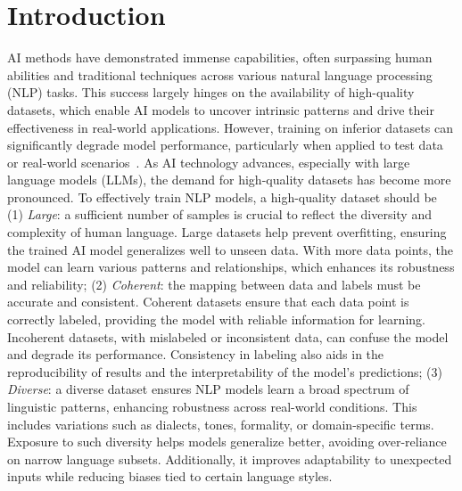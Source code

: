 \section{Introduction}


AI methods have demonstrated immense capabilities, often surpassing human abilities and traditional techniques across various natural language processing (NLP) tasks. 
This success largely hinges on the availability of high-quality datasets, which enable AI models to uncover intrinsic patterns and drive their effectiveness in real-world applications. 
However, training on inferior datasets can significantly degrade model performance, particularly when applied to test data or real-world scenarios~\cite{wang2024comprehensive}. 
As AI technology advances, especially with large language models (LLMs), the demand for high-quality datasets has become more pronounced. 
To effectively train NLP models, a high-quality dataset should be (1) \textit{Large}: 
a sufficient number of samples is crucial to reflect the diversity and complexity of human language.  
Large datasets help prevent overfitting, ensuring the trained AI model generalizes well to unseen data. 
With more data points, the model can learn various patterns and relationships, which enhances its robustness and reliability; 
(2) \textit{Coherent}: the mapping between data and labels must be accurate and consistent. 
Coherent datasets ensure that each data point is correctly labeled, providing the model with reliable information for learning. 
Incoherent datasets, with mislabeled or inconsistent data, can confuse the model and degrade its performance. 
Consistency in labeling also aids in the reproducibility of results and the interpretability of the model's predictions; 
(3) \textit{Diverse}: a diverse dataset ensures NLP models learn a broad spectrum of linguistic patterns, enhancing robustness across real-world conditions. 
This includes variations such as dialects, tones, formality, or domain-specific terms.
Exposure to such diversity helps models generalize better, avoiding over-reliance on narrow language subsets. 
Additionally, it improves adaptability to unexpected inputs while reducing biases tied to certain language styles.

